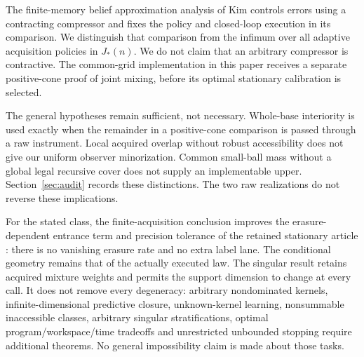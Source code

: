 The finite-memory belief approximation analysis of Kim \cite{Kim2026} controls errors using a contracting compressor and fixes the policy and closed-loop execution in its comparison. We distinguish that comparison from the infimum over all adaptive acquisition policies in $J_*(n)$. We do not claim that an arbitrary compressor is contractive. The common-grid implementation in this paper receives a separate positive-cone proof of joint mixing, before its optimal stationary calibration is selected.

The general hypotheses remain sufficient, not necessary. Whole-base interiority is used exactly when the remainder in a positive-cone comparison is passed through a raw instrument. Local acquired overlap without robust accessibility does not give our uniform observer minorization. Common small-ball mass without a global legal recursive cover does not supply an implementable upper. Section~\ref{sec:audit} records these distinctions. The two raw realizations do not reverse these implications.

For the stated class, the finite-acquisition conclusion improves the erasure-dependent entrance term and precision tolerance of the retained stationary article \cite{GTFStationary}: there is no vanishing erasure rate and no extra label lane. The conditional geometry remains that of the actually executed law. The singular result retains acquired mixture weights and permits the support dimension to change at every call. It does not remove every degeneracy: arbitrary nondominated kernels, infinite-dimensional predictive closure, unknown-kernel learning, nonsummable inaccessible classes, arbitrary singular stratifications, optimal program/workspace/time tradeoffs and unrestricted unbounded stopping require additional theorems. No general impossibility claim is made about those tasks.
